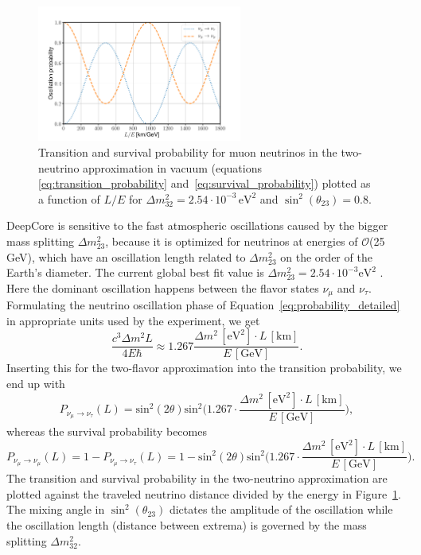\begin{figure}[h]
    \centering
    \includegraphics[trim=40 10 60 60, clip, width=0.6\textwidth]{figures/oscillation_probabilities.pdf}
    \caption[Vacuum oscillation probabilities in the two-neutrino approximation]
    {Transition and survival probability for muon neutrinos in the two-neutrino approximation in vacuum (equations \eqref{eq:transition_probability} and~\eqref{eq:survival_probability}) plotted as a function of $L/E$ for $\Delta m^{2}_{32}=2.54\cdot 10^{-3}\,\mathrm{eV}^2$ and $\sin^{2}(\theta_{23}) = 0.8$.}
    \label{fig:oscillation_probabilities}
\end{figure}

DeepCore is sensitive to the fast atmospheric oscillations caused by the bigger mass splitting $\Delta m^2_{23}$, because it is optimized for neutrinos at energies of $\mathcal{O}$(25\,GeV), which have an oscillation length related to $\Delta m^2_{23}$ on the order of the Earth's diameter.
The current global best fit value is $\Delta m^2_{23}=2.54\cdot 10^{-3}\mathrm{eV}^2$ \cite{PhysRevD.98.030001}.
Here the dominant oscillation happens between the flavor states $\nu_\mu$ and $\nu_\tau$.
Formulating the neutrino oscillation phase of Equation~\eqref{eq:probability_detailed} in appropriate units used by the experiment, we get 
\begin{equation}
    \frac{c^3\Delta m^2L}{4E\hbar} \approx 1.267\frac{\Delta m^2\,[\mathrm{eV}^2]\cdot L\,[\mathrm{km}]}{E\,[\mathrm{GeV}]}.
\end{equation}
Inserting this for the two-flavor approximation into the transition probability, we end up with
\begin{equation}
    P_{\nu_\mu \rightarrow \nu_\tau}(L)
    = 
    \textrm{sin}^2(2\theta)\textrm{sin}^2\Big( 1.267 \cdot \frac{\Delta m^2\,[\mathrm{eV}^2]\cdot L\,[\mathrm{km}]}{E\,[\mathrm{GeV}]} \Big),
    \label{eq:transition_probability}
\end{equation}
whereas the survival probability becomes
\begin{equation}
    P_{\nu_\mu \rightarrow \nu_\mu}(L)
    = 1 - P_{\nu_\mu \rightarrow \nu_\tau}(L)
    =
    1 - \textrm{sin}^2(2\theta)\textrm{sin}^2\Big( 1.267 \cdot \frac{\Delta m^2\,[\mathrm{eV}^2]\cdot L\,[\mathrm{km}]}{E\,[\mathrm{GeV}]} \Big).
    \label{eq:survival_probability}
\end{equation}
The transition and survival probability in the two-neutrino approximation are plotted against the traveled neutrino distance divided by the energy in Figure~\ref{fig:oscillation_probabilities}.
The mixing angle in $\sin^{2}(\theta_{23})$ dictates the amplitude of the oscillation while the oscillation length (distance between extrema) is governed by the mass splitting $\Delta m^{2}_{32}$.
